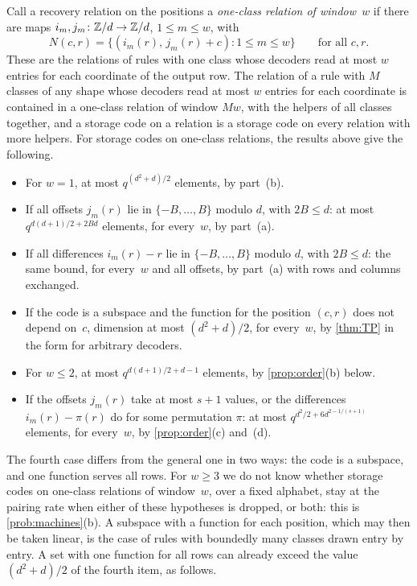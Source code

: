 Call a recovery relation on the positions a \emph{one-class relation of window~$w$} if there are maps
$i_m,j_m\colon\mathbb{Z}/d\to\mathbb{Z}/d$, $1\le m\le w$, with
\[
  N(c,r)=\{(i_m(r),\,j_m(r)+c):1\le m\le w\}\qquad\text{for all }c,r .
\]
These are the relations of rules with one class whose decoders read at most $w$ entries for each coordinate of the
output row. The relation of a rule with $M$ classes of any shape whose decoders read at most $w$ entries for each
coordinate is contained in a one-class relation of window $Mw$, with the helpers of all classes together, and a
storage code on a relation is a storage code on every relation with more helpers. For storage codes on one-class
relations, the results above give the following.
\begin{itemize}[leftmargin=1.5em]
\item For $w=1$, at most $q^{(d^2+d)/2}$ elements, by part~(b).
\item If all offsets $j_m(r)$ lie in $\{-B,\dots,B\}$ modulo $d$, with $2B\le d$: at most $q^{d(d+1)/2+2Bd}$
elements, for every~$w$, by part~(a).
\item If all differences $i_m(r)-r$ lie in $\{-B,\dots,B\}$ modulo $d$, with $2B\le d$: the same bound, for
every~$w$ and all offsets, by part~(a) with rows and columns exchanged.
\item If the code is a subspace and the function for the position $(c,r)$ does not depend on~$c$, dimension at most
$(d^2+d)/2$, for every~$w$, by \cref{thm:TP} in the form for arbitrary decoders.
\item For $w\le2$, at most $q^{d(d+1)/2+d-1}$ elements, by \cref{prop:order}(b) below.
\item If the offsets $j_m(r)$ take at most $s+1$ values, or the differences $i_m(r)-\pi(r)$ do for some permutation
$\pi$: at most $q^{d^2/2+6d^{2-1/(s+1)}}$ elements, for every~$w$, by \cref{prop:order}(c) and~(d).
\end{itemize}
The fourth case differs from the general one in two ways: the code is a subspace, and one function serves all rows.
For $w\ge3$ we do not know whether storage codes on one-class relations of window~$w$, over a fixed alphabet, stay at
the pairing rate when either of these hypotheses is dropped, or both: this is \cref{prob:machines}(b). A subspace with a
function for each position, which may then be taken linear, is the case of rules with boundedly many classes drawn
entry by entry. A set with one function for all rows can already exceed the value $(d^2+d)/2$ of the fourth item, as
follows.

